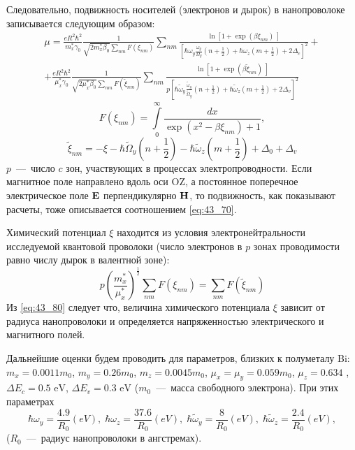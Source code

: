 Следовательно, подвижность носителей (электронов и дырок) в нанопроволоке записывается следующим образом:
\begin{multline} \label{eq:43_70}
	\mu =\frac{eR^2{\hbar }^2}{m^*_x \gamma_0}\frac{1}{\sqrt{2m^*_x \beta_0}\sum_{nm}{F\left(\xi_{nm}\right)}}\sum_{nm}{\frac{\ln \left[1+{\exp \left(\beta {\xi }_{nm}\right)\ }\right]}{\left[\hbar \omega_y\frac{\omega_y}{\Omega_y} \left(n+\frac{1}{2}\right)+\hbar \omega_z\left(m+\frac{1}{2}\right)+ 2\Delta_c\right]^2}}+\\
	+\frac{eR^2 \hbar^2}{\mu^*_x \gamma_0}\frac{1}{\sqrt{2\mu^*_x \beta_0}\sum_{nm}{F\left(\widetilde{\xi }_{nm}\right)}}\sum_{nm}{\frac{\ln \left[1+{\exp \left(\beta \widetilde{\xi}_{nm}\right)\ }\right]}{p{\left[\hbar \widetilde{\omega}_y \frac{\widetilde{\omega}_y}{\widetilde{\Omega}_y}\left(n+\frac{1}{2}\right)+\hbar \widetilde{\omega}_z \left(m+\frac{1}{2}\right)+2{\Delta }_v\right]}^2}}
\end{multline}
\[
	F\left(\xi_{nm}\right)=\int\limits^{\infty }_0 {\frac{dx}{\exp \left(x^2-\beta {\xi }_{nm}\right) +1}},
\]
\[
	\widetilde{\xi }_{nm}=-\xi -\hbar \widetilde{\Omega}_y\left(n+\frac{1}{2}\right)-\hbar \widetilde{\omega}_z\left(m+\frac{1}{2}\right)+\Delta_0+\Delta_v
\]
$p$~---~число $c$ зон, участвующих в процессах электропроводности. Если магнитное поле направлено вдоль оси OZ, а постоянное поперечное электрическое поле $\boldsymbol{\mathbf{E}}$ перпендикулярно $\boldsymbol{\mathbf{H}}$, то подвижность, как показывают расчеты, тоже описывается соотношением \eqref{eq:43_70}.

Химический потенциал $\xi $ находится из условия электронейтральности исследуемой квантовой проволоки (число электронов в $p$ зонах проводимости равно числу дырок в валентной зоне):
\begin{equation} \label{eq:43_80}
	p{\left(\frac{m^*_x}{{\mu }^*_x}\right)}^{\frac{1}{2}}\sum_{nm}{F\left({\xi }_{nm}\right)}=\sum_{nm}{F\left({\widetilde{\xi }}_{nm}\right)}
\end{equation}
Из \eqref{eq:43_80} следует что, величина химического потенциала $\xi $ зависит от радиуса нанопроволоки и определяется напряженностью электрического и магнитного полей.

Дальнейшие оценки будем проводить для параметров, близких к полуметалу Bi: $m_x=0.0011m_0$, $m_y=0.26m_0$, $m_z=0.0045m_0$, ${\mu }_x={\mu }_y= 0.059 m_0$, $\mu_z = 0.634$ \cite{Levin2009a}, $\Delta E_c=0.5\text{ eV}$, $\Delta E_v =0.3\text{ eV}$ ($m_0$~---~масса свободного электрона). При этих параметрах
\[
	\hbar {\omega }_y=\frac{4.9}{R_0}\left(eV\right),\;
	\hbar {\omega }_z=\frac{37.6}{R_0}\left(eV\right),\;
	\hbar {\widetilde{\omega }}_y=\frac{8}{R_0}\left(eV\right),\;
	\hbar {\widetilde{\omega }}_z=\frac{2.4}{R_0}\left(eV\right),
\]
($R_0$~---~радиус нанопроволоки в ангстремах).

